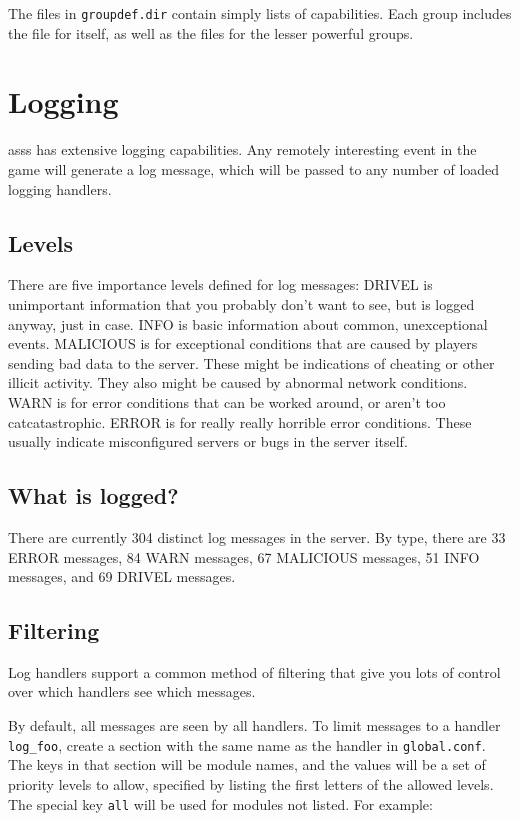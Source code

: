 \documentclass{article}
\newcommand{\asss}{asss}
\begin{document}
The files in \verb/groupdef.dir/ contain simply lists of capabilities.
Each group includes the file for itself, as well as the files for the
lesser powerful groups.


\section{Logging}

\asss{} has extensive logging capabilities. Any remotely interesting
event in the game will generate a log message, which will be passed to
any number of loaded logging handlers.

\subsection{Levels}

There are five importance levels defined for log messages: DRIVEL is
unimportant information that you probably don't want to see, but is
logged anyway, just in case. INFO is basic information about common,
unexceptional events. MALICIOUS is for exceptional conditions that are
caused by players sending bad data to the server. These might be
indications of cheating or other illicit activity. They also might be
caused by abnormal network conditions. WARN is for error conditions that
can be worked around, or aren't too catcatastrophic. ERROR is for really
really horrible error conditions. These usually indicate misconfigured
servers or bugs in the server itself.

\subsection{What is logged?}

There are currently
304
distinct log messages in the server. By type, there are 33 ERROR
messages, 84 WARN messages, 67 MALICIOUS messages, 51 INFO messages, and
69 DRIVEL messages.

\subsection{Filtering}

Log handlers support a common method of filtering that give you lots of
control over which handlers see which messages.

By default, all messages are seen by all handlers. To limit messages to
a handler \verb/log_foo/, create a section with the same name as the
handler in \verb/global.conf/. The keys in that section will be module
names, and the values will be a set of priority levels to allow,
specified by listing the first letters of the allowed levels. The
special key \verb/all/ will be used for modules not listed. For example:
\end{document}
